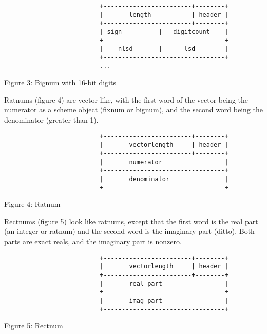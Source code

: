 \begin{minipage}{\linewidth}
\begin{verbatim}
                          +------------------------+--------+
                          |       length           | header |
                          +------------------------+--------+
                          | sign          |   digitcount    |
                          +---------------------------------+
                          |    nlsd       |      lsd        |
                          +---------------------------------+
                          ...
\end{verbatim}
\centerline{Figure 3: Bignum with 16-bit digits}
\end{minipage}

Ratnums (figure 4) are vector-like, with the first word of
the vector being the numerator as a scheme object (fixnum or bignum),
and the second word being the denominator (greater than 1).

\begin{minipage}{\linewidth}
\begin{verbatim}
                          +------------------------+--------+
                          |       vectorlength     | header |
                          +------------------------+--------+
                          |       numerator                 |
                          +---------------------------------+
                          |       denominator               |
                          +---------------------------------+
\end{verbatim}
\centerline{Figure 4: Ratnum}
\end{minipage}

Rectnums (figure 5) look like ratnums, except that the
first word is the real part (an integer or ratnum) and the second word
is the imaginary part (ditto). Both parts are exact reals, and the
imaginary part is nonzero.

\begin{minipage}{\linewidth}
\begin{verbatim}
                          +------------------------+--------+
                          |       vectorlength     | header |
                          +------------------------+--------+
                          |       real-part                 |
                          +---------------------------------+
                          |       imag-part                 |
                          +---------------------------------+
\end{verbatim}
\centerline{Figure 5: Rectnum}
\end{minipage}

